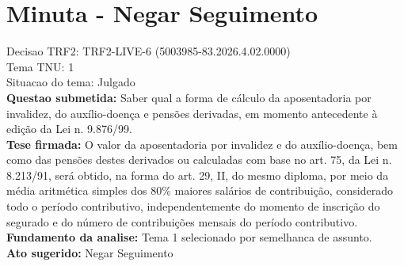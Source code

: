 \documentclass{article}
\begin{document}
\section*{Minuta - Negar Seguimento}
Decisao TRF2: TRF2-LIVE-6 (5003985-83.2026.4.02.0000)\\
Tema TNU: 1\\
Situacao do tema: Julgado\\
\textbf{Questao submetida:} Saber qual a forma de cálculo da aposentadoria por invalidez, do auxílio-doença e pensões derivadas, em momento antecedente à edição da Lei n. 9.876/99.\\
\textbf{Tese firmada:} O valor da aposentadoria por invalidez e do auxílio-doença, bem como das pensões destes derivados ou calculadas com base no art. 75, da Lei n. 8.213/91, será obtido, na forma do art. 29, II, do mesmo diploma, por meio da média aritmética simples dos 80\% maiores salários de contribuição, considerado todo o período contributivo, independentemente do momento de inscrição do segurado e do número de contribuições mensais do período contributivo.\\
\textbf{Fundamento da analise:} Tema 1 selecionado por semelhanca de assunto.\\
\textbf{Ato sugerido:} Negar Seguimento
\end{document}
